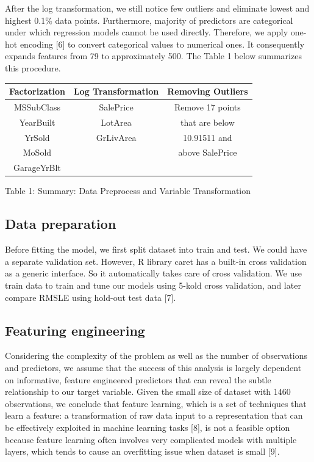 \documentclass[letterpaper, 10 pt, conference]{ieeeconf}\usepackage[]{graphicx}\usepackage[]{color}
\begin{document}
After the log transformation, we still notice few outliers and eliminate lowest and highest 0.1\% data points. Furthermore, majority of predictors are categorical under which regression models cannot be used directly. Therefore, we apply one-hot encoding [6] to convert categorical values to numerical ones. It consequently expands features from 79 to approximately 500. The Table 1 below summarizes this procedure.

\begin{center}
\centering
\begin{tabular}{ | c | c | c |}
  \hline			
  Factorization & Log Transformation & Removing Outliers \\
  \hline  
  MSSubClass & SalePrice & Remove 17 points \\
  YearBuilt & LotArea & that are below \\
  YrSold & GrLivArea & 10.91511 and \\ 
  MoSold & & above SalePrice\\
  GarageYrBlt & & \\
  \hline  
\end{tabular}
\end{center}
Table 1: Summary: Data Preprocess and Variable Transformation

\subsection{Data preparation}
Before fitting the model, we first split dataset into train and test. We could have a separate validation set. However,  R library caret has a built-in cross validation as a generic interface. So it automatically takes care of cross validation. We use train data to train and tune our models using 5-kold cross validation, and later compare RMSLE using hold-out test data [7].

\subsection{Featuring engineering}

Considering the complexity of the problem as well as the number of observations and predictors, we assume that the success of this analysis is largely dependent on informative, feature engineered predictors that can reveal the subtle relationship to our target variable. Given the small size of dataset with 1460 observations, we conclude that feature learning, which is a set of techniques that learn a feature: a transformation of raw data input to a representation that can be effectively exploited in machine learning tasks [8], is not a feasible option because feature learning often involves very complicated models with multiple layers, which tends to cause an overfitting issue when dataset is small [9].
\end{document}
